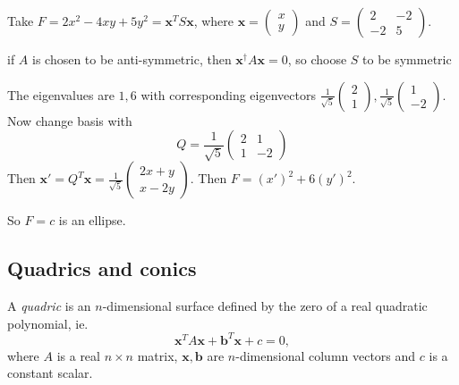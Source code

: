 \documentclass[a4paper]{article}
\begin{document}
      \begin{eg}
        Take $F = 2x^2 - 4xy + 5y^2 = \mathbf{x}^TS\mathbf{x}$, where $\mathbf{x} = 
        \begin{pmatrix}
          x\\y
        \end{pmatrix}$ and $S = 
        \begin{pmatrix}
          2 & -2\\
          -2 & 5
        \end{pmatrix}$.

        \note if $A$ is chosen to be anti-symmetric, then $\mathbf{x}^\dagger A\mathbf{x} = 0$, so choose $S$ to be symmetric

        The eigenvalues are $1, 6$ with corresponding eigenvectors $
        \displaystyle \frac{1}{\sqrt{5}}\begin{pmatrix}
          2\\1
        \end{pmatrix},\frac{1}{\sqrt{5}}
        \begin{pmatrix}
          1\\-2
        \end{pmatrix}$. Now change basis with
        \[
          Q = \frac{1}{\sqrt{5}}
          \begin{pmatrix}
            2 & 1\\
            1 & -2
          \end{pmatrix}
        \]
        Then $\mathbf{x}' = Q^T\mathbf{x} =
        \frac{1}{\sqrt{5}}\begin{pmatrix}
          2x + y\\x - 2y
        \end{pmatrix}$. Then $F = (x')^2 + 6(y')^2$.

        So $F = c$ is an ellipse.
      \end{eg}

      \subsection{Quadrics and conics}

      \begin{defi}[Quadric]
        A \emph{quadric} is an $n$-dimensional surface defined by the zero of a real quadratic polynomial, ie.
        \[
          \mathbf{x}^T A\mathbf{x} + \mathbf{b}^T\mathbf{x} + c = 0,
        \]
        where $A$ is a real $n\times n$ matrix, $\mathbf{x}, \mathbf{b}$ are $n$-dimensional column vectors and $c$ is a constant scalar.
      \end{defi}
\end{document}
